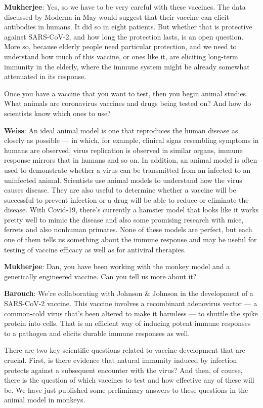 \textbf{Mukherjee}: Yes, so we have to be very careful with these
vaccines. The data discussed by Moderna in May would suggest that their
vaccine can elicit antibodies in humans. It did so in eight patients.
But whether that is protective against SARS-CoV-2, and how long the
protection lasts, is an open question. More so, because elderly people
need particular protection, and we need to understand how much of this
vaccine, or ones like it, are eliciting long-term immunity in the
elderly, where the immune system might be already somewhat attenuated in
its response.

Once you have a vaccine that you want to test, then you begin animal
studies. What animals are coronavirus vaccines and drugs being tested
on? And how do scientists know which ones to use?

\textbf{Weiss}: An ideal animal model is one that reproduces the human
disease as closely as possible --- in which, for example, clinical signs
resembling symptoms in humans are observed, virus replication is
observed in similar organs, immune response mirrors that in humans and
so on. In addition, an animal model is often used to demonstrate whether
a virus can be transmitted from an infected to an uninfected animal.
Scientists use animal models to understand how the virus causes disease.
They are also useful to determine whether a vaccine will be successful
to prevent infection or a drug will be able to reduce or eliminate the
disease. With Covid-19, there's currently a hamster model that looks
like it works pretty well to mimic the disease and also some promising
research with mice, ferrets and also nonhuman primates. None of these
models are perfect, but each one of them tells us something about the
immune response and may be useful for testing of vaccine efficacy as
well as for antiviral therapies.

\textbf{Mukherjee}: Dan, you have been working with the monkey model and
a genetically engineered vaccine. Can you tell us more about it?

\textbf{Barouch}: We're collaborating with Johnson \& Johnson in the
development of a SARS-CoV-2 vaccine. This vaccine involves a recombinant
adenovirus vector --- a common-cold virus that's been altered to make it
harmless --- to shuttle the spike protein into cells. That is an
efficient way of inducing potent immune responses to a pathogen and
elicits durable immune responses as well.

There are two key scientific questions related to vaccine development
that are crucial. First, is there evidence that natural immunity induced
by infection protects against a subsequent encounter with the virus? And
then, of course, there is the question of which vaccines to test and how
effective any of these will be. We have just published some preliminary
answers to these questions in the animal model in monkeys.


